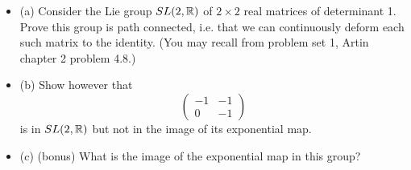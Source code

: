\documentclass{article}
\begin{document}
\bigskip
\begin{prob}
    \begin{itemize}
    \item (a) Consider the Lie group $SL(2, \mathbb{R})$ of $2 \times 2$ real matrices of determinant 1. Prove this group is path connected, i.e. that we can continuously deform each such matrix to the identity. (You may recall from problem set 1, Artin chapter 2 problem 4.8.)
    \item (b) Show however that
        \[ \begin{pmatrix}
            -1 & -1 \\
            0 & -1
        \end{pmatrix} \]
        is in $SL(2, \mathbb{R})$ but not in the image of its exponential map.
    \item (c) (bonus) What is the image of the exponential map in this group?
    \end{itemize}
\end{prob}
\end{document}
